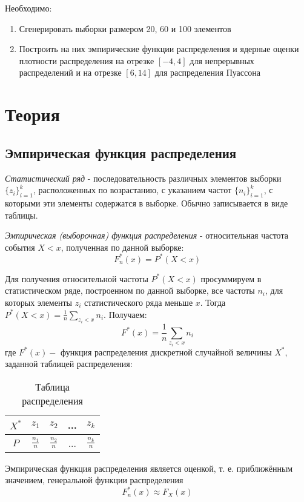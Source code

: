 \documentclass[12pt,a4paper]{article}
\begin{document}
Необходимо:
\begin{enumerate}
    \item Сгенерировать выборки размером 20, 60 и 100 элементов
    \item Построить на них эмпирические функции распределения и ядерные оценки плотности распределения на отрезке $[-4, 4]$ для непрерывных распределений и на отрезке $[6, 14]$ для распределения Пуассона
\end{enumerate}

\section{Теория}
\subsection{Эмпирическая функция распределения}
\textit{Статистический ряд} - последовательность различных элементов выборки ${\{z_i\}}_{i=1}^k$, расположенных по возрастанию, с указанием частот ${\{n_i\}}_{i=1}^k$, с которыми эти элементы содержатся в выборке. Обычно записывается в виде таблицы.

\textit{Эмпирическая (выборочная) функция распределения} - относительная частота события $X<x$, полученная по данной выборке:
\begin{equation}
    F_n^*(x)=P^*(X<x)
\end{equation}

Для получения относительной частоты $P^*(X < x)$ просуммируем в статистическом ряде, построенном по данной выборке, все частоты $n_i$, для которых элементы $z_i$ статистического ряда меньше $x$. Тогда $P^*(X < x) = \frac{1}{n}\sum_{z_i<x}n_i$. Получаем:
\begin{equation}
    F^*(x)=\frac{1}{n}\sum_{z_i<x}n_i
\end{equation}
где $F^*(x)-$ функция распределения дискретной случайной величины $X^*$, заданной таблицей распределения:
\begin{table}[H]
    \centering
    \begin{tabular}{|c|c|c|c|c|}
        \hline
         $X^*$ & $z_1$ & $z_2$ & ... & $z_k$\\
         \hline
         $P$ & $\frac{n_1}{n}$ & $\frac{n_2}{n}$ & ... & $\frac{n_k}{n}$\\
         \hline
    \end{tabular}
    \caption{Таблица распределения}
\end{table}
Эмпирическая функция распределения является оценкой, т. е. приближённым значением, генеральной функции распределения
\begin{equation}
F_n^*(x)\approx F_X(x)
\end{equation}
\end{document}
